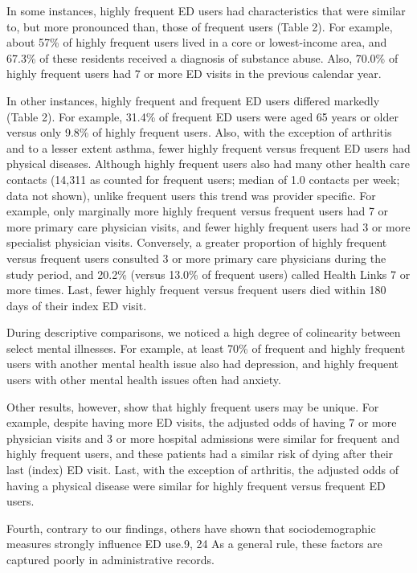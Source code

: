 In some instances, highly frequent ED users had characteristics that were similar to, but more pronounced than, those of frequent users (Table 2). For example, about 57\% of highly frequent users lived in a core or lowest-income area, and 67.3\% of these residents received a diagnosis of substance abuse. Also, 70.0\% of highly frequent users had 7 or more ED visits in the previous calendar year.

In other instances, highly frequent and frequent ED users differed markedly (Table 2). For example, 31.4\% of frequent ED users were aged 65 years or older versus only 9.8\% of highly frequent users. Also, with the exception of arthritis and to a lesser extent asthma, fewer highly frequent versus frequent ED users had physical diseases. Although highly frequent users also had many other health care contacts (14,311 as counted for frequent users; median of 1.0 contacts per week; data not shown), unlike frequent users this trend was provider specific. For example, only marginally more highly frequent versus frequent users had 7 or more primary care physician visits, and fewer highly frequent users had 3 or more specialist physician visits. Conversely, a greater proportion of highly frequent versus frequent users consulted 3 or more primary care physicians during the study period, and 20.2\% (versus 13.0\% of frequent users) called Health Links 7 or more times. Last, fewer highly frequent versus frequent users died within 180 days of their index ED visit.

During descriptive comparisons, we noticed a high degree of colinearity between select mental illnesses. For example, at least 70\% of frequent and highly frequent users with another mental health issue also had depression, and highly frequent users with other mental health issues often had anxiety. 

Other results, however, show that highly frequent users may be unique. For example, despite having more ED visits, the adjusted odds of having 7 or more physician visits and 3 or more hospital admissions were similar for frequent and highly frequent users, and these patients had a similar risk of dying after their last (index) ED visit. Last, with the exception of arthritis, the adjusted odds of having a physical disease were similar for highly frequent versus frequent ED users.

Fourth, contrary to our findings, others have shown that sociodemographic measures strongly influence ED use.9, 24 As a general rule, these factors are captured poorly in administrative records.


